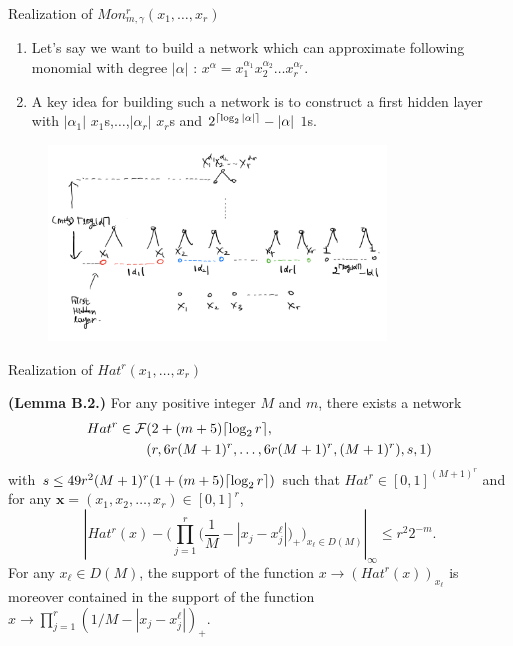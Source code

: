 \documentclass{if-beamer}
\DeclarePairedDelimiter{\ceil}{\lceil}{\rceil}
\begin{document}
\begin{frame}{Realization of $Mon_{m,\gamma}^{r}(x_{1},\dots,x_{r})$}
    \begin{enumerate}
    \item Let's say we want to build a network which can approximate following monomial with degree $|\alpha|$ : $x^{\alpha}=x_{1}^{\alpha_{1}}x_{2}^{\alpha_{2}}\dots x_{r}^{\alpha_{r}}.$
    \item A key idea for building such a network is to construct a first hidden layer with $|\alpha_{1}|$ $x_{1}$s,$\dots$,$|\alpha_{r}|$ $x_{r}$s and $2^{\ceil{\log_{2}|\alpha|}}-|\alpha|$ $1$s.
    \end{enumerate}
    
    \begin{figure}[htbp]
        \includegraphics[width=0.8\textwidth]{LemmaA4.png}
        \label{fig:figure4}
    \end{figure}
\end{frame}

\begin{frame}{Realization of $Hat^{r}(x_{1},\dots,x_{r})$}

\begin{tcolorbox}
    \textbf{(Lemma B.2.)}
    For any positive integer $M$ and $m$, there exists a network 
    \begin{align*}
        Hat^{r} \in \mathcal{F}&(2+(m+5) \ceil{\log_{2}r},\\
            &(r,6r(M+1)^{r},\dots,6r(M+1)^{r},(M+1)^{r}),s,1)
    \end{align*}
    with $s\leq 49r^{2}(M+1)^{r}(1+(m+5)\ceil{\log_{2}r})$ such that $Hat^{r}\in[0,1]^{(M+1)^{r}}$ and for any $\textbf{x}=(x_{1},x_{2},\dots,x_{r})\in[0,1]^{r}$,
    \begin{equation*}
        \left| Hat^{r}(x)-\bigg(\prod_{j=1}^{r}\bigg(\frac{1}{M}-|x_j - x_j^{\ell}|\bigg)_{+} \bigg)_{x_{\ell}\in D(M)} \right|_{\infty} \leq r^{2}2^{-m}.
    \end{equation*}
    For any $x_{\ell} \in D(M)$, the support of the function $x\rightarrow{(Hat^{r}(x))_{x_\ell}}$ is moreover contained in the support of the function $x\rightarrow{\prod_{j=1}^{r}(1/M - |x_{j}-x_{j}^{\ell}|)_{+}}$.
\end{tcolorbox}

\end{frame}
\end{document}
